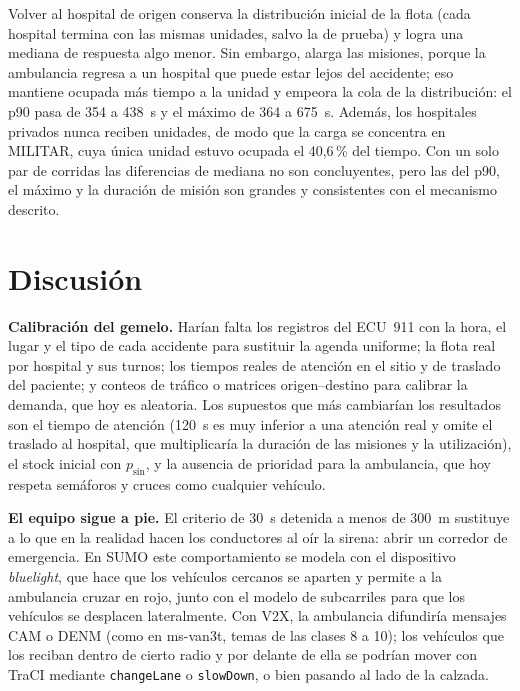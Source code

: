 \documentclass[conference,a4paper]{IEEEtran}
\begin{document}
Volver al hospital de origen conserva la distribución inicial de la flota (cada hospital
termina con las mismas unidades, salvo la de prueba) y logra una mediana de respuesta algo
menor. Sin embargo, alarga las misiones, porque la ambulancia regresa a un hospital que
puede estar lejos del accidente; eso mantiene ocupada más tiempo a la unidad y empeora la
cola de la distribución: el p90 pasa de 354 a 438~s y el máximo de 364 a 675~s. Además,
los hospitales privados nunca reciben unidades, de modo que la carga se concentra en
MILITAR, cuya única unidad estuvo ocupada el 40,6\,\% del tiempo. Con un solo par de
corridas las diferencias de mediana no son concluyentes, pero las del p90, el máximo y
la duración de misión son grandes y consistentes con el mecanismo descrito.

\section{Discusión}
\textbf{Calibración del gemelo.} Harían falta los registros del ECU~911 con la hora, el
lugar y el tipo de cada accidente para sustituir la agenda uniforme; la flota real por
hospital y sus turnos; los tiempos reales de atención en el sitio y de traslado del
paciente; y conteos de tráfico o matrices origen--destino para calibrar la demanda, que
hoy es aleatoria. Los supuestos que más cambiarían los resultados son el tiempo de
atención (120~s es muy inferior a una atención real y omite el traslado al hospital, que
multiplicaría la duración de las misiones y la utilización), el stock inicial con
$p_{\mathrm{sin}}$, y la ausencia de prioridad para la ambulancia, que hoy respeta
semáforos y cruces como cualquier vehículo.

\textbf{El equipo sigue a pie.} El criterio de 30~s detenida a menos de 300~m sustituye a lo que en la
realidad hacen los conductores al oír la sirena: abrir un corredor de emergencia. En SUMO
este comportamiento se modela con el dispositivo \emph{bluelight}, que hace que los
vehículos cercanos se aparten y permite a la ambulancia cruzar en rojo, junto con el
modelo de subcarriles para que los vehículos se desplacen lateralmente. Con V2X, la
ambulancia difundiría mensajes CAM o DENM (como en ms-van3t, temas de las clases 8 a 10);
los vehículos que los reciban dentro de cierto radio y por delante de ella se podrían
mover con TraCI mediante \texttt{changeLane} o \texttt{slowDown}, o bien pasando al lado
de la calzada.
\end{document}
